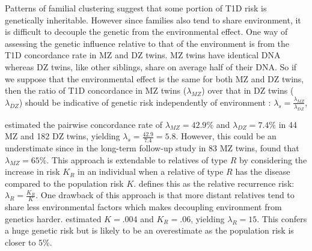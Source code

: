Patterns of familial clustering suggest that some portion of T1D risk is genetically inheritable.
However since families also tend to share environment, it is difficult to decouple the genetic from the environmental effect.
One way of assessing the genetic influence relative to that of the environment is from the T1D concordance rate in \gls{MZ} and \gls{DZ} twins.
MZ twins have identical \gls{DNA} whereas DZ twins, like other siblings, share on average half of their DNA.
So if we suppose that the environmental effect is the same for both \gls{MZ} and \gls{DZ} twins, then the ratio of T1D concordance in \gls{MZ} twins ($\lambda_{MZ}$) 
over that in DZ twins ($\lambda_{DZ}$) should be indicative of genetic risk independently of environment \citep{Clayton:2009kf}:
$ \lambda_s = \frac{\lambda_{MZ}}{\lambda_{DZ}}$,


\citet{Hyttinen:2003kn} estimated the pairwise concordance rate of $\lambda_{MZ}=42.9\%$ and $\lambda_{DZ}=7.4\%$ in 44 MZ and 182 DZ twins,
yielding $\lambda_s = \frac{42.9}{7.4} = 5.8$.
However, this could be an understimate since in the long-term follow-up study in 83 MZ twins, \citet{Redondo:2008} found that $\lambda_{MZ}=65\%$.
This approach is extendable to relatives of type $R$ by considering the increase in risk $K_R$ in an individual when a relative of type $R$ has the disease compared to the population risk $K$.
\citet{Risch:1987wm} defines this as the relative recurrence risk: $\lambda_R = \frac{K_R}{K}$.
One drawback of this approach is that more distant relatives tend to share less environmental factors which makes decoupling environment from genetics harder.
\cite{Risch:1987wm} estimated $K=.004$ and $K_R=.06$, yielding $\lambda_R=15$.
This confers a huge genetic risk but is likely to be an overestimate as the population risk is closer to $5\%$.

